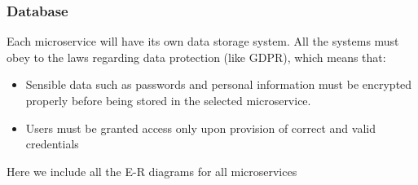 \subsubsection{Database}
Each microservice will have its own data storage system. All the systems must obey to the laws regarding data protection (like GDPR), which means that:
\begin{itemize}
\item Sensible data such as passwords and personal information must be encrypted properly before being stored in the selected microservice.
\item Users must be granted access only upon provision of correct and valid credentials
\end{itemize}

Here we include all the E-R diagrams for all microservices

